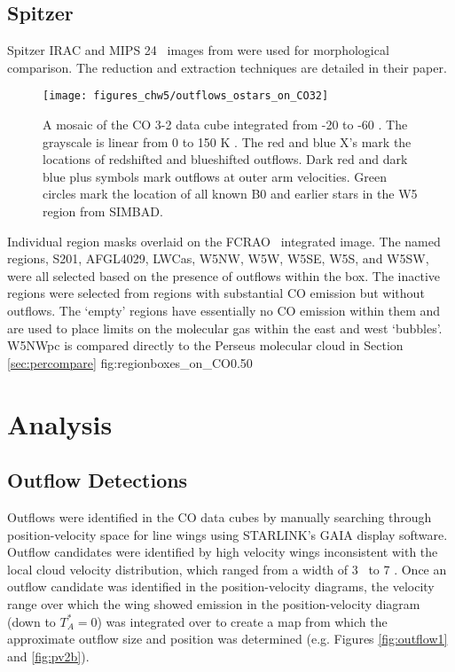 \subsection{Spitzer}
Spitzer IRAC and MIPS 24 \um\ images from \citet{koenig:clustered:2008} were
used for morphological comparison.  The reduction and extraction techniques are
detailed in their paper.

\begin{figure*}
  \texttt{[image: figures\_chw5/outflows\_ostars\_on\_CO32]}
  \caption{A mosaic of the CO 3-2 data cube integrated from -20 to -60 \kms.
  The grayscale is linear from 0 to 150 K \kms.  The red and blue X's mark the
  locations of redshifted and blueshifted outflows.  Dark red and dark blue
  plus symbols mark outflows at outer arm velocities.  Green circles mark the
  location of all known B0 and earlier stars in the W5 region from SIMBAD.}
  \label{fig:outflows_on_co32}
\end{figure*}

{Individual region masks overlaid on the FCRAO \twelveco\ integrated image.
The named regions, S201, AFGL4029, LWCas, W5NW, W5W, W5SE, W5S, and W5SW, were all
selected based on the presence of outflows within the box.
The inactive regions were selected from regions with substantial CO emission
but without outflows.  The `empty' regions have essentially no CO emission within
them and are used to place limits on the molecular gas within the east and west
`bubbles'.  W5NWpc is compared directly to the Perseus molecular cloud in 
Section \ref{sec:percompare}
}{fig:regionboxes_on_CO}{0.5}{0}


\section{Analysis}
\subsection{Outflow Detections}
Outflows were identified in the CO data cubes by manually searching through
position-velocity space for line wings using STARLINK's GAIA display software.  Outflow
candidates were identified by high velocity wings inconsistent with the local
cloud velocity distribution, which ranged from a width of 3 \kms\ to  7 \kms.
Once an outflow candidate was identified in the position-velocity diagrams, the
velocity range over which the wing showed emission in the position-velocity
diagram (down to $T_A^*=0$) was integrated over to create a map from which the
approximate outflow size and position was determined (e.g. Figures
\ref{fig:outflow1} and \ref{fig:pv2b}). 

